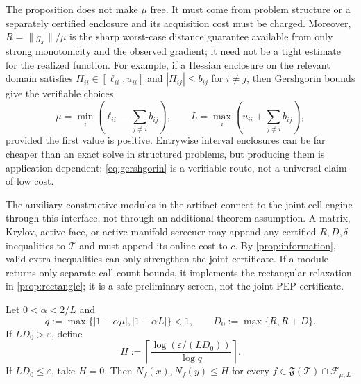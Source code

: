 \documentclass[smallextended]{svjour3}
\newcommand{\cF}{\mathcal{F}}
\newcommand{\cT}{\mathcal{T}}
\newcommand{\norm}[1]{\lVert #1\rVert}
\newcommand{\eps}{\varepsilon}
\begin{document}
The proposition does not make $\mu$ free.  It must come from problem structure
or a separately certified enclosure and its acquisition cost must be charged.
Moreover, $R=\norm{g_x}/\mu$ is the sharp worst-case distance guarantee
available from only strong monotonicity and the observed gradient; it need not
be a tight estimate for the realized function.
For example, if a Hessian enclosure on the relevant domain satisfies
$H_{ii}\in[\ell_{ii},u_{ii}]$ and $|H_{ij}|\leq b_{ij}$ for $i\neq j$, then
Gershgorin bounds give the verifiable choices
\begin{equation}
 \mu=\min_i\left(\ell_{ii}-\sum_{j\neq i}b_{ij}\right),\qquad
 L=\max_i\left(u_{ii}+\sum_{j\neq i}b_{ij}\right),                 \label{eq:gershgorin}
\end{equation}
provided the first value is positive.  Entrywise interval enclosures can be
far cheaper than an exact solve in structured problems, but producing them is
application dependent; \eqref{eq:gershgorin} is a verifiable route, not a
universal claim of low cost.

The auxiliary constructive modules in the artifact connect to the joint-cell
engine through this interface, not through an additional theorem assumption.  A
matrix, Krylov, active-face, or active-manifold screener may append any
certified $R,D,\delta$ inequalities to $\cT$ and must append its online cost to
$c$.  By \cref{prop:information}, valid extra inequalities can only strengthen
the joint certificate.  If a module returns only separate call-count bounds,
it implements the rectangular relaxation in \cref{prop:rectangle}; it is a
safe preliminary screen, not the joint PEP certificate.

\begin{proposition}
\label{prop:horizon}
Let $0<\alpha<2/L$ and
\[
 q:=\max\{|1-\alpha\mu|,|1-\alpha L|\}<1,
 \qquad D_0:=\max\{R,R+D\}.
\]
If $LD_0>\eps$, define
\begin{equation}
 H:=\left\lceil\frac{\log(\eps/(LD_0))}{\log q}\right\rceil.
 \label{eq:horizon}
\end{equation}
If $LD_0\leq\eps$, take $H=0$.  Then
$N_f(x),N_f(y)\leq H$ for every $f\in\mathfrak F(\cT)\cap\cF_{\mu,L}$.
\end{proposition}
\end{document}
